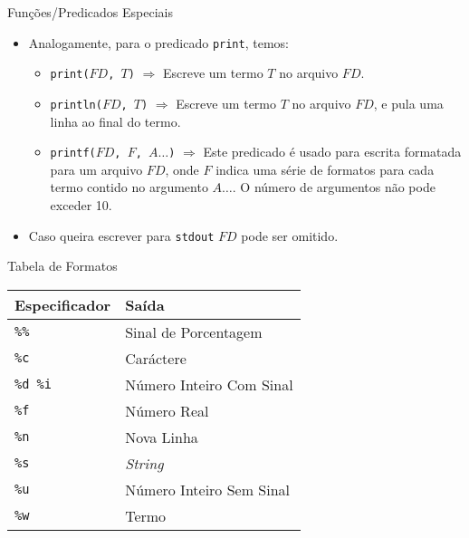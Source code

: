 \begin{frame}[c,allowframebreaks]{Funções/Predicados Especiais}
\begin{itemize}
\begin{itemize}
        \end{itemize}
        
        \framebreak
        
        \item Analogamente, para o predicado \texttt{print}, temos:
        
        \begin{itemize}

            \item \texttt{print($FD$, $T$)} $\Rightarrow$ Escreve um termo $T$ no arquivo 
            $FD$.
            
            \item \texttt{println($FD$, $T$)} $\Rightarrow$ Escreve um termo $T$ no arquivo 
            $FD$, e pula uma linha ao final do termo.
            
            \item \texttt{printf($FD$, $F$, $A\ldots$)} $\Rightarrow$ Este predicado é usado 
            para escrita formatada para um arquivo $FD$, onde $F$ indica uma série de 
            formatos para cada termo contido no argumento $A\ldots$. O número de argumentos 
            não pode exceder 10.

        \end{itemize}
        
        \item Caso queira escrever para \texttt{stdout} $FD$ pode ser omitido.
        
    \end{itemize}
    
\end{frame}


\begin{frame}{Tabela de Formatos}
    
    \begin{table}[h]
        \begin{tabular}{|l|l|}
            \hline
            \textbf{Especificador} & \textbf{Saída} \\
            \hline 
            \hline 
            \texttt{\%\%} & Sinal de Porcentagem \\
            \texttt{\%c} & Caráctere \\
            \texttt{\%d \%i} & Número Inteiro Com Sinal \\
            \texttt{\%f} & Número Real \\
            \texttt{\%n} & Nova Linha \\
            \texttt{\%s} & \textit{String} \\
            \texttt{\%u} & Número Inteiro Sem Sinal \\
            \texttt{\%w} & Termo \\
            \hline
        \end{tabular}
    \end{table}
\end{frame}

